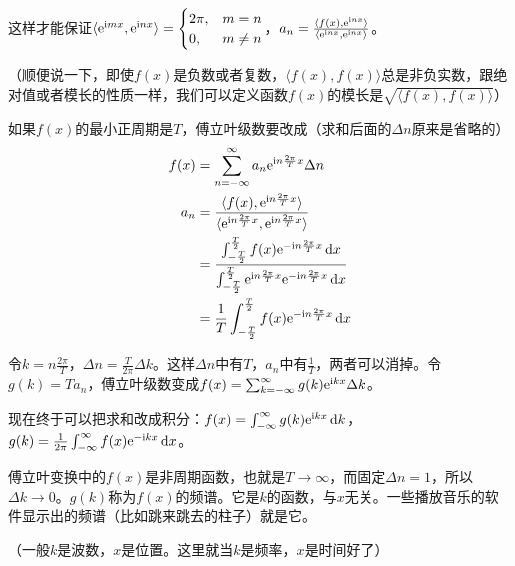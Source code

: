 这样才能保证$\langle \mathrm{e}^{\mathrm{i} m x},\mathrm{e}^{\mathrm{i} n x} \rangle=\begin{cases} 2 \pi, &m=n \\ 0, &m \neq n \end{cases}$，$a_n=\frac{ \langle f(x),\mathrm{e}^{\mathrm{i} n x} \rangle}{\langle \mathrm{e}^{\mathrm{i} n x},\mathrm{e}^{\mathrm{i} n x} \rangle}$。

（顺便说一下，即使$f(x)$是负数或者复数，$\langle f(x),f(x) \rangle$总是非负实数，跟绝对值或者模长的性质一样，我们可以定义函数$f(x)$的模长是$\sqrt{\langle f(x),f(x) \rangle}$）

如果$f(x)$的最小正周期是$T$，傅立叶级数要改成（求和后面的$\Delta n$原来是省略的）
\begin{align*}
f(x)&=\sum_{n=-\infty}^{\infty} a_n \mathrm{e}^{\mathrm{i} n \frac{2 \pi}{T} x} \Delta n \\
a_n&=\frac{\langle f(x),\mathrm{e}^{\mathrm{i} n \frac{2 \pi}{T} x} \rangle}{\langle \mathrm{e}^{\mathrm{i} n \frac{2 \pi}{T} x},\mathrm{e}^{\mathrm{i} n \frac{2 \pi}{T} x} \rangle} \\
&=\frac{\int_{-\frac{T}{2}}^{\frac{T}{2}} f(x) \mathrm{e}^{-\mathrm{i} n \frac{2 \pi}{T} x} \mathop{}\!\mathrm{d} x}{\int_{-\frac{T}{2}}^{\frac{T}{2}} \mathrm{e}^{\mathrm{i} n \frac{2 \pi}{T} x} \mathrm{e}^{-\mathrm{i} n \frac{2 \pi}{T} x} \mathop{}\!\mathrm{d} x} \\
&=\frac{1}{T} \int_{-\frac{T}{2}}^{\frac{T}{2}} f(x) \mathrm{e}^{-\mathrm{i} n \frac{2 \pi}{T} x} \mathop{}\!\mathrm{d} x
\end{align*}

令$k=n \frac{2 \pi}{T}$，$\Delta n=\frac{T}{2 \pi} \Delta k$。这样$\Delta n$中有$T$，$a_n$中有$\frac{1}{T}$，两者可以消掉。令$g(k)=T a_n$，傅立叶级数变成$f(x)=\sum_{k=-\infty}^{\infty} g(k) \mathrm{e}^{\mathrm{i} k x} \Delta k$。

现在终于可以把求和改成积分：$f(x)=\int_{-\infty}^{\infty} g(k) \mathrm{e}^{\mathrm{i} k x} \mathop{}\!\mathrm{d} k$，$g(k)=\frac{1}{2 \pi} \int_{-\infty}^{\infty} f(x) \mathrm{e}^{-\mathrm{i} k x} \mathop{}\!\mathrm{d} x$。

傅立叶变换中的$f(x)$是非周期函数，也就是$T \rightarrow \infty$，而固定$\Delta n=1$，所以$\Delta k \rightarrow 0$。$g(k)$称为$f(x)$的频谱。它是$k$的函数，与$x$无关。一些播放音乐的软件显示出的频谱（比如跳来跳去的柱子）就是它。

（一般$k$是波数，$x$是位置。这里就当$k$是频率，$x$是时间好了）

